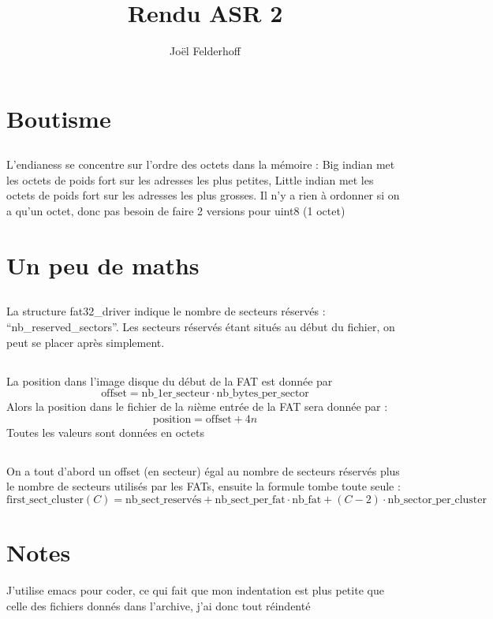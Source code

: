 \documentclass[11pt]{article} %
\title{Rendu ASR 2}
\author{Joël Felderhoff}
\begin{document}
\maketitle

\section{Boutisme}
\subsection{}
L'endianess se concentre sur l'ordre des octets dans la mémoire : Big indian met les octets de poids fort sur les adresses les plus petites, Little indian met les octets de poids fort sur les adresses les plus grosses. Il n'y a rien à ordonner si on a qu'un octet, donc pas besoin de faire 2 versions pour uint8 (1 octet)

\setcounter{section}{2}
\section{Un peu de maths}
\subsection{}
La structure fat32\_driver indique le nombre de secteurs réservés : ``nb\_reserved\_sectors''. Les secteurs réservés étant situés au début du fichier, on peut se placer après simplement.
\subsection{}
La position dans l'image disque du début de la FAT est donnée par 
$$\text{offset} = \text{nb\_1er\_secteur} \cdot \text{nb\_bytes\_per\_sector} $$
Alors la position dans le fichier de la $n$ième entrée de la FAT sera donnée par :
$$ \text{position} = \text{offset} + 4n$$
Toutes les valeurs sont données en octets
\setcounter{subsection}{3}
\subsection{}
On a tout d'abord un offset (en secteur) égal au nombre de secteurs réservés plus le nombre de secteurs utilisés par les FATs, ensuite la formule tombe toute seule :
$$
  \text{first\_sect\_cluster}(C) = \text{nb\_sect\_reservés} + \text{nb\_sect\_per\_fat} \cdot \text{nb\_fat} + (C-2) \cdot \text{nb\_sector\_per\_cluster}
$$


\section*{Notes}
J'utilise emacs pour coder, ce qui fait que mon indentation est plus petite que celle des fichiers donnés dans l'archive, j'ai donc tout réindenté
\end{document}
